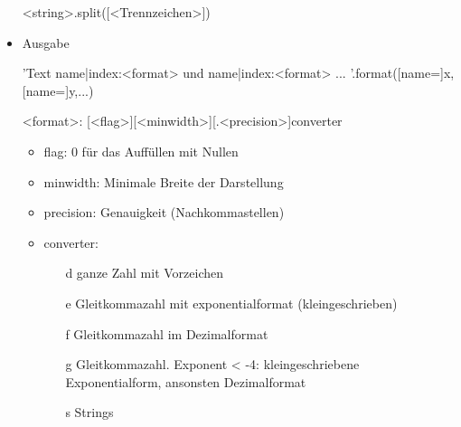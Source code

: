 \documentclass[a4paper,9pt,DIV15,twocolumn]{scrartcl}
\begin{document}
\begin{itemize}
\begin{sagein}
 <string>.split([<Trennzeichen>])
\end{sagein}
\item Ausgabe
\begin{sagein}
'Text {name|index:<format>} und {name|index:<format>} ... '.format([name=]x,[name=]y,...)
 \end{sagein}
 <format>:  {[<flag>][<minwidth>][.<precision>]converter}
 \begin{itemize}
\item flag: 0 für das Auffüllen mit Nullen
\item minwidth: Minimale Breite der Darstellung
\item precision: Genauigkeit (Nachkommastellen)
\item converter:
    \begin{itemize}
        \item[d]  ganze Zahl mit Vorzeichen
        \item[e]  Gleitkommazahl mit exponentialformat (kleingeschrieben)
        \item[f]  Gleitkommazahl im Dezimalformat
        \item[g]  Gleitkommazahl. Exponent < -4: kleingeschriebene Exponentialform, ansonsten Dezimalformat
        \item[s]  Strings
    \end{itemize}
 \end{itemize}

\end{itemize}
\end{document}
